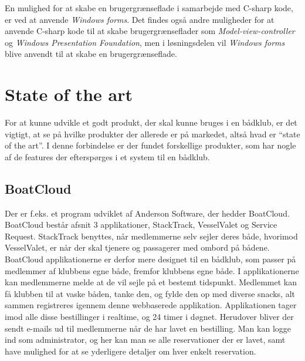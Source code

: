 En mulighed for at skabe en brugergrænseflade i samarbejde med C-sharp kode, er ved at anvende \textit{Windows forms}. 
Det findes også andre muligheder for at anvende C-sharp kode til at skabe brugergrænseflader som \textit{Model-view-controller} og \textit{Windows Presentation Foundation}, men i løsningsdelen vil \textit{Windows forms} blive anvendt til at skabe en brugergrænseflade. 

\section{State of the art}
For at kunne udvikle et godt produkt, der skal kunne bruges i en bådklub, er det vigtigt, at se på hvilke
produkter der allerede er på markedet, altså hvad er ``state of the art''. I denne forbindelse er der fundet
forskellige produkter, som har nogle af de features der efterspørges i et system til en bådklub. 
\newline

\subsection*{BoatCloud}

Der er f.eks.
et program udviklet af Anderson Software, der hedder BoatCloud.\citep{BoatCloud} BoatCloud består afsnit 3
applikationer, StackTrack, VesselValet og Service Request. StackTrack benyttes, når medlemmerne selv sejler
deres både, hvorimod VesselValet, er når der skal tjenere og passagerer med ombord på bådene. 
BoatCloud applikationerne er derfor mere designet til en bådklub, som passer på medlemmer af klubbens egne både, fremfor
klubbens egne både. 
I applikationerne kan medlemmerne melde at de vil sejle på et bestemt tidspunkt. 
Medlemmet kan få klubben til at vaske båden, tanke den, og fylde den op med diverse snacks, alt sammen registreres
igennem denne webbaserede applikation. 
Applikationen tager imod alle disse bestillinger i realtime, og 24 timer i døgnet. 
Herudover bliver der sendt e-mails ud til medlemmerne når de har lavet en bestilling. 
Man kan logge ind som administrator, og her kan man se alle reservationer der er lavet, samt have mulighed for at
se yderligere detaljer om hver enkelt reservation.


